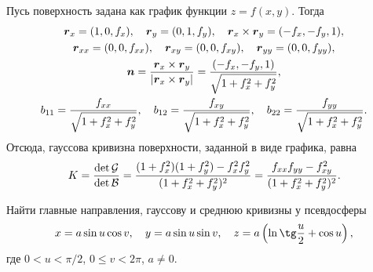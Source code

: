 \begin{example}
	Пусь поверхность задана как график функции $z = f(x, y)$. Тогда
	\begin{gather*}
		\boldsymbol{r}_x = (1, 0, f_x),\quad \boldsymbol{r}_{y} = (0, 1, f_y),\quad \boldsymbol{r}_x \times \boldsymbol{r}_y = (-f_x, -f_y, 1),\\
		\boldsymbol{r}_{xx} = (0, 0, f_{xx}),\quad \boldsymbol{r}_{xy} = (0, 0, f_{xy}),\quad \boldsymbol{r}_{yy} = (0, 0, f_{yy}),\\
		\boldsymbol{n} = \frac{\boldsymbol{r}_x \times \boldsymbol{r}_y}{\left\lvert\boldsymbol{r}_x \times \boldsymbol{r}_y\right\rvert} = \frac{(-f_x, -f_y, 1)}{\sqrt{1 + f_x^2 + f_y^2}},\\
		b_{11} = \frac{f_{xx}}{\sqrt{1 + f_x^2 + f_y^2}},\quad b_{12} = \frac{f_{xy}}{\sqrt{1 + f_x^2 + f_y^2}},\quad b_{22} = \frac{f_{yy}}{\sqrt{1 + f_x^2 + f_y^2}}.
	\end{gather*}
	Отсюда, гауссова кривизна поверхности, заданной в виде графика, равна
	\[
		K = \frac{\det\mathcal{G}}{\det\mathcal{B}} = \frac{(1 + f_x^2)(1 + f_y^2) - f_x^2f_y^2}{(1 + f_x^2 + f_y^2)^2} = \frac{f_{xx}f_{yy} - f_{xy}^2}{(1 + f_x^2 + f_y^2)^2}.
	\]
\end{example}

\begin{problem}
	Найти главные направления, гауссову и среднюю кривизны у псевдосферы
	\[
		x = a\sin u\cos v,\quad y = a\sin u\sin v,\quad z = a\br{\ln\tg\frac{u}{2} + \cos u},
	\]
	где $0 < u < \pi / 2$, $0 \leqslant v < 2\pi$, $a \ne 0$.
\end{problem}

